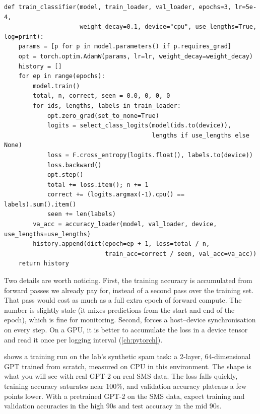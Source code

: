\begin{lstlisting}[caption={Classification fine-tuning loop (lab reference).},label={lst:classify:train}]
def train_classifier(model, train_loader, val_loader, epochs=3, lr=5e-4,
                     weight_decay=0.1, device="cpu", use_lengths=True, log=print):
    params = [p for p in model.parameters() if p.requires_grad]
    opt = torch.optim.AdamW(params, lr=lr, weight_decay=weight_decay)
    history = []
    for ep in range(epochs):
        model.train()
        total, n, correct, seen = 0.0, 0, 0, 0
        for ids, lengths, labels in train_loader:
            opt.zero_grad(set_to_none=True)
            logits = select_class_logits(model(ids.to(device)),
                                         lengths if use_lengths else None)
            loss = F.cross_entropy(logits.float(), labels.to(device))
            loss.backward()
            opt.step()
            total += loss.item(); n += 1
            correct += (logits.argmax(-1).cpu() == labels).sum().item()
            seen += len(labels)
        va_acc = accuracy_loader(model, val_loader, device, use_lengths=use_lengths)
        history.append(dict(epoch=ep + 1, loss=total / n,
                            train_acc=correct / seen, val_acc=va_acc))
    return history
\end{lstlisting}

Two details are worth noticing. First, the training accuracy is accumulated from
forward passes we already pay for, instead of a second pass over the training set. That
pass would cost as much as a full extra epoch of forward compute. The number is
slightly stale (it mixes predictions from the start and end of the epoch), which is
fine for monitoring. Second,  forces a host--device synchronisation
on every step. On a GPU, it is better to accumulate the loss in a device tensor and
read it once per logging interval (\cref{ch:pytorch}).

 shows a training run on the lab's synthetic spam task: a
2-layer, 64-dimensional GPT trained from scratch, measured on CPU in this environment.
The shape is what you will see with real GPT-2 on real SMS data. The loss falls
quickly, training accuracy saturates near 100\%, and validation accuracy plateaus a few
points lower. With a pretrained GPT-2 on the SMS data, expect training and validation
accuracies in the high 90s and test accuracy in the mid 90s.

